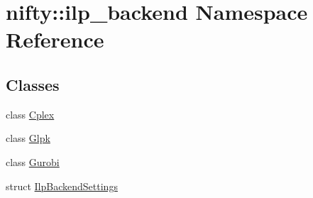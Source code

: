 \hypertarget{namespacenifty_1_1ilp__backend}{}\section{nifty\+:\+:ilp\+\_\+backend Namespace Reference}
\label{namespacenifty_1_1ilp__backend}
\subsection*{Classes}
\begin{DoxyCompactItemize}
\item 
class \hyperlink{classnifty_1_1ilp__backend_1_1Cplex}{Cplex}
\item 
class \hyperlink{classnifty_1_1ilp__backend_1_1Glpk}{Glpk}
\item 
class \hyperlink{classnifty_1_1ilp__backend_1_1Gurobi}{Gurobi}
\item 
struct \hyperlink{structnifty_1_1ilp__backend_1_1IlpBackendSettings}{Ilp\+Backend\+Settings}
\end{DoxyCompactItemize}
